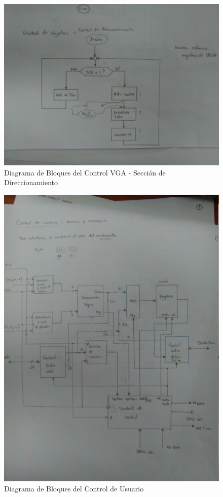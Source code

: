 \documentclass[12pt,a4paper]{report}
\begin{document}
\begin{figure}[hbtp]
	\centering
	\includegraphics[width=15cm]{Img/ControlDireccionamientoVGAFlujo.jpg}
	\caption{Diagrama de Bloques del Control VGA - Sección de Direccionamiento}
	\label{fig:DireccionamientoFlujoVGA1}
\end{figure}

\begin{figure}[hbtp]
	\centering
	\includegraphics[width=15cm]{Img/ControlUsuarioBloques.jpg}
	\caption{Diagrama de Bloques del Control de Usuario}
	\label{fig:BloquesUsuario1}
\end{figure}
\end{document}
